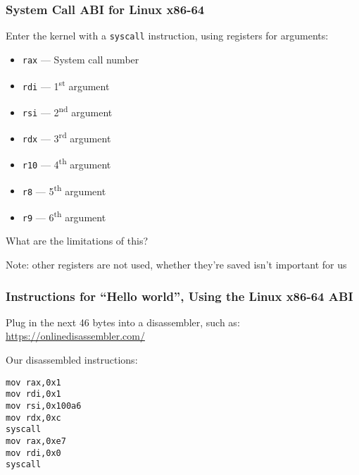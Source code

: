   \begin{frame}
    \frametitle{System Call ABI for Linux x86-64}

    Enter the kernel with a \texttt{syscall} instruction, using registers for
    arguments:

    \begin{itemize}
      \item \texttt{rax} --- System call number
      \item \texttt{rdi} --- 1\textsuperscript{st} argument
      \item \texttt{rsi} --- 2\textsuperscript{nd} argument
      \item \texttt{rdx} --- 3\textsuperscript{rd} argument
      \item \texttt{r10} --- 4\textsuperscript{th} argument
      \item \texttt{r8} --- 5\textsuperscript{th} argument
      \item \texttt{r9} --- 6\textsuperscript{th} argument
    \end{itemize}

    What are the limitations of this?

    \vspace{2em}

    Note: other registers are not used, whether they're saved isn't important
    for us
  \end{frame}

  \begin{frame}[fragile]
    \frametitle{Instructions for ``Hello world'', Using the Linux x86-64 ABI}

    Plug in the next 46 bytes into a disassembler, such as:
    \url{https://onlinedisassembler.com/}

    \vspace{2em}

    Our disassembled instructions:
    \begin{lstlisting}[xleftmargin=2em]
mov rax,0x1
mov rdi,0x1
mov rsi,0x100a6
mov rdx,0xc
syscall
mov rax,0xe7
mov rdi,0x0
syscall
    \end{lstlisting}
  \end{frame}

